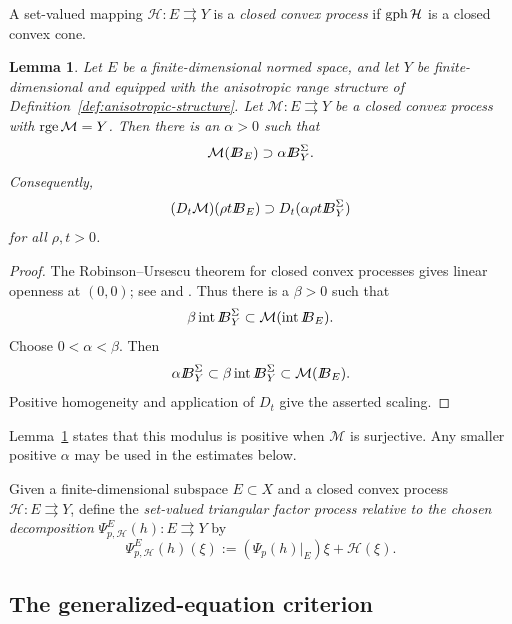 \documentclass[11pt]{amsart}
\newtheorem{lemma}[theorem]{Lemma}
\theoremstyle{definition}
\theoremstyle{remark}
\newcommand{\tto}{\rightrightarrows}
\newcommand{\gph}{\mathop{\rm gph}\nolimits}
\newcommand{\rge}{\mathop{\rm rge}\nolimits}
\def\ball{{I\kern -.35em B}}
\begin{document}
	A set-valued mapping $\mathcal H:E\tto Y$ is a \emph{closed convex
		process} if $\gph\mathcal H$ is a closed convex cone.
	
	\begin{lemma}
		\label{lem:convex-process-covering}
		Let $E$ be a finite-dimensional normed space, and let $Y$ be
		finite-dimensional and equipped with the anisotropic range structure of
		Definition~\ref{def:anisotropic-structure}. Let
		$\mathcal M:E\tto Y$ be a closed convex process with
		$\rge\mathcal M=Y$.  Then there is an $\alpha>0$ such that
		$$
		\mathcal M(\ball_E)\supset\alpha\ball_Y^{\Sigma}.
		$$
		Consequently,
		$$
		(D_t\mathcal M)(\rho t\ball_E)
		\supset D_t(\alpha\rho t\ball_Y^{\Sigma})
		$$
		for all $\rho,t>0$.
	\end{lemma}
	
	\begin{proof}
		The Robinson--Ursescu theorem for closed convex processes gives linear
		openness at $(0,0)$; see
		\cite{UrsescuConvexGraph,RobinsonConvexMultivalued} and
		\cite[Theorem~3.1]{CibulkaRoubalSetValued}.
		Thus there is a $\beta>0$ such that
		$$
		\beta\mathop{\rm int}\ball_Y^\Sigma
		\subset\mathcal M(\mathop{\rm int}\ball_E).
		$$
		Choose $0<\alpha<\beta$.  Then
		$$
		\alpha\ball_Y^\Sigma
		\subset\beta\mathop{\rm int}\ball_Y^\Sigma
		\subset\mathcal M(\ball_E).
		$$
		Positive homogeneity and application of $D_t$ give the asserted
		scaling.
	\end{proof}
	
	Lemma~\ref{lem:convex-process-covering} states that this modulus is positive
	when $\mathcal M$ is surjective. Any smaller positive $\alpha$ may be used
	in the estimates below.
	
	Given a finite-dimensional subspace $E\subset X$ and a closed convex process
	$\mathcal H:E\tto Y$, define the
	\emph{set-valued triangular factor process relative to the chosen
		decomposition} $\Psi_{p,\mathcal H}^{E}(h):E\tto Y$ by
	\begin{equation*}
		\Psi_{p,\mathcal H}^{E}(h)(\xi)
		:=(\Psi_p(h)\vert_E)\xi+\mathcal H(\xi).
	\end{equation*}
	
	\subsection{The generalized-equation criterion}
	
\end{document}
